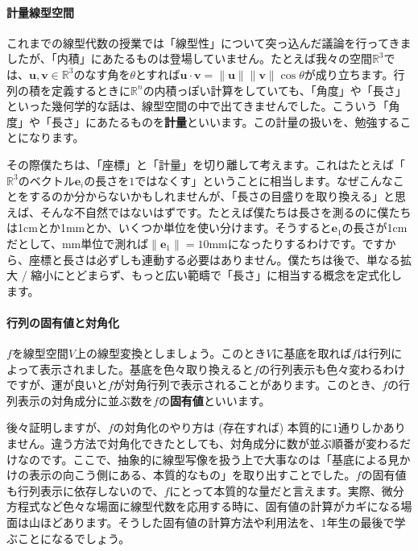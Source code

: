 \paragraph{計量線型空間}

これまでの線型代数の授業では「線型性」について突っ込んだ議論を行ってきましたが、「内積」にあたるものは登場していません。たとえば我々の空間$\mathbb{R}^3$では、$\bm{u}, \bm{v} \in \mathbb{R}^3$のなす角を$\theta$とすれば$\bm{u} \cdot \bm{v} = \|\bm{u}\| \|\bm{v}\| \cos \theta$が成り立ちます。行列の積を定義するときに$\mathbb{R}^n$の内積っぽい計算をしていても、「角度」や「長さ」といった幾何学的な話は、線型空間の中で出てきませんでした。こういう「角度」や「長さ」にあたるものを\textbf{計量}といいます。この計量の扱いを、勉強することになります。

その際僕たちは、「座標」と「計量」を切り離して考えます。これはたとえば「$\mathbb{R}^3$のベクトル$\bm{e}_i$の長さを$1$ではなくす」ということに相当します。なぜこんなことをするのか分からないかもしれませんが、「長さの目盛りを取り換える」と思えば、そんな不自然ではないはずです。たとえば僕たちは長さを測るのに僕たちは1cmとか1mmとか、いくつか単位を使い分けます。そうすると$\bm{e}_1$の長さが1cmだとして、mm単位で測れば$\|\bm{e}_1\| = 10\textrm{mm}$になったりするわけです。ですから、座標と長さは必ずしも連動する必要はありません。僕たちは後で、単なる拡大 / 縮小にとどまらず、もっと広い範疇で「長さ」に相当する概念を定式化します。

\paragraph{行列の固有値と対角化}

$f$を線型空間$V$上の線型変換としましょう。このとき$V$に基底を取れば$f$は行列によって表示されました。基底を色々取り換えると$f$の行列表示も色々変わるわけですが、運が良いと$f$が対角行列で表示されることがあります。このとき、$f$の行列表示の対角成分に並ぶ数を$f$の\textbf{固有値}といいます。

後々証明しますが、$f$の対角化のやり方は (存在すれば) 本質的に$1$通りしかありません。違う方法で対角化できたとしても、対角成分に数が並ぶ順番が変わるだけなのです。ここで、抽象的に線型写像を扱う上で大事なのは「基底による見かけの表示の向こう側にある、本質的なもの」を取り出すことでした。$f$の固有値も行列表示に依存しないので、$f$にとって本質的な量だと言えます。実際、微分方程式など色々な場面に線型代数を応用する時に、固有値の計算がカギになる場面は山ほどあります。そうした固有値の計算方法や利用法を、$1$年生の最後で学ぶことになるでしょう。

